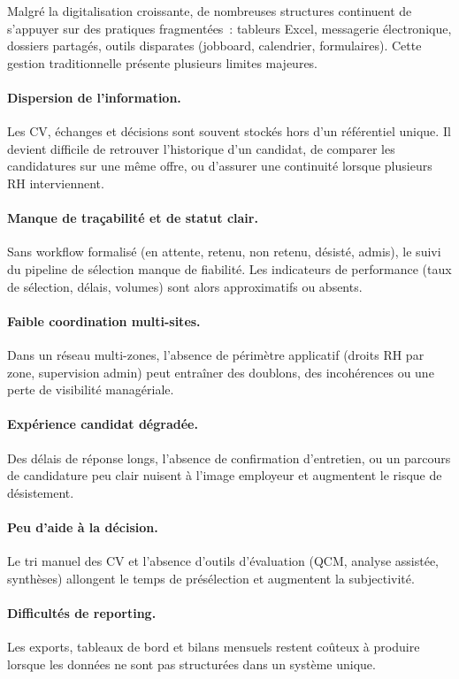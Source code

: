 Malgré la digitalisation croissante, de nombreuses structures continuent de s'appuyer
sur des pratiques fragmentées~: tableurs Excel, messagerie électronique, dossiers
partagés, outils disparates (jobboard, calendrier, formulaires). Cette gestion
\og{}traditionnelle\fg{} présente plusieurs limites majeures.

\paragraph{Dispersion de l'information.}
Les CV, échanges et décisions sont souvent stockés hors d'un référentiel unique.
Il devient difficile de retrouver l'historique d'un candidat, de comparer les
candidatures sur une même offre, ou d'assurer une continuité lorsque plusieurs RH
interviennent.

\paragraph{Manque de traçabilité et de statut clair.}
Sans workflow formalisé (en attente, retenu, non retenu, désisté, admis), le
suivi du pipeline de sélection manque de fiabilité. Les indicateurs de performance
(taux de sélection, délais, volumes) sont alors approximatifs ou absents.

\paragraph{Faible coordination multi-sites.}
Dans un réseau multi-zones, l'absence de périmètre applicatif (droits RH par zone,
supervision admin) peut entraîner des doublons, des incohérences ou une perte de
visibilité managériale.

\paragraph{Expérience candidat dégradée.}
Des délais de réponse longs, l'absence de confirmation d'entretien, ou un parcours
de candidature peu clair nuisent à l'image employeur et augmentent le risque de
désistement.

\paragraph{Peu d'aide à la décision.}
Le tri manuel des CV et l'absence d'outils d'évaluation (QCM, analyse assistée,
synthèses) allongent le temps de présélection et augmentent la subjectivité.

\paragraph{Difficultés de reporting.}
Les exports, tableaux de bord et bilans mensuels restent coûteux à produire lorsque
les données ne sont pas structurées dans un système unique.

